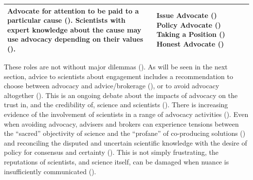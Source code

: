 \begin{table}[!ht]
\begin{tabular}{L{.48\linewidth}L{.30\linewidth}L{.22\linewidth}}
Advocate for attention to be paid to a particular cause (\cite{KarkkainenLKK2024}). Scientists with expert knowledge about the cause may use advocacy depending on their values (\cite{RykielEtAl2002,RapleyD2014,ElsensohnACDGGKPRS2019}).  & Issue Advocate (\cite{Pielke2007}) Policy Advocate (\cite{ScottRLPAFSRSS2007}) Taking a Position (\cite{SteelLLS2004}) Honest Advocate (\cite{RoseBOP2018,GregoryBW2024}) %
& \textcite{SteelLLS2004,ScottRLPAFSRSS2007,SinghTKMMC2014,RoseBOP2018,DablanderSCSBGGBAH2024} \\ \hline
\end{tabular}
\end{table}

These roles are not without major dilemmas (\cite{NelsonV2009,CairneyO2020}). As will be seen in the next section, advice to scientists about \SPI{} engagement includes a recommendation to choose between advocacy and advice/brokerage (\cite{OliverC2019}), or to avoid advocacy altogether (\cite{Lackey2007,Gluckman2014}). This is an ongoing debate about the impacts of advocacy on the trust in, and the credibility of, science and scientists (\cite{Edwards2013,GregoryBW2024,ColognaKMBMO2024,DablanderSCSBGGBAH2024,RykielEtAl2002}). There is increasing evidence of the involvement of \CAN{} scientists in a range of advocacy activities (\cite{ColognaKMBMO2024,DablanderSCSBGGBAH2024,ScottRLPAFSRSS2007}). Even when avoiding advocacy, advisers and brokers can experience tensions between the ``sacred'' objectivity of science and the ``profane'' of co-producing solutions (\cite{WesselinkH2020,MacKillopCDD2023}) and reconciling the disputed and uncertain scientific knowledge with the desire of policy for consensus and certainty (\cite{Stirling2010,Hicks2024}). This is not simply frustrating, the reputations of scientists, and science itself, can be damaged when nuance is insufficiently communicated (\cite{Stirling2010,OjanenBKP2021}).

